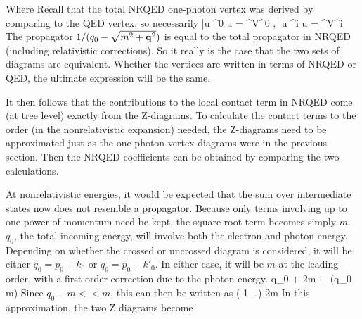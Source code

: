 Where
Recall that the total NRQED one-photon vertex was derived by comparing to the QED vertex, so necessarily
\beq
	\bar{u} \Gamma^0 u = \phi^\dagger V^0 \phi , \;  \bar{u} \Gamma^i u = \phi^\dagger V^i \phi
\eeq 
The propagator $1/(q_0 - \sqrt{m^2 + \mathbf{q}^2})$ is equal to the total propagator in NRQED (including relativistic corrections).  So it really is the case that the two sets of diagrams are equivalent.  Whether the vertices are written in terms of NRQED or QED, the ultimate expression will be the same.

It then follows that the contributions to the local contact term in NRQED come (at tree level) exactly from the Z-diagrams.  To calculate the contact terms to the order (in the nonrelativistic expansion) needed, the Z-diagrams need to be approximated just as the one-photon vertex diagrams were in the previous section.  Then the NRQED coefficients can be obtained by comparing the two calculations.  

At nonrelativistic energies, it would be expected that the sum over intermediate states now does not resemble a propagator.  Because only terms involving up to one power of momentum need be kept, the square root term becomes simply $m$.  $q_0$, the total incoming energy, will involve both the electron and photon energy.  Depending on whether the crossed or uncrossed diagram is considered, it will be either $q_0 = p_0 + k_0$ or $q_0 = p_0 - k'_0$.  In either case, it will be $m$ at the leading order, with a first order correction due to the photon energy. 
\beq
	  {q_0 +  } 
		\approx {}  {2m + (q_0-m) }
\eeq
Since $q_0-m << m$, this can then be written as 
\beq
		\approx  \left( 1 -  \right )   {2m}
\eeq
In this approximation, the two Z diagrams become


